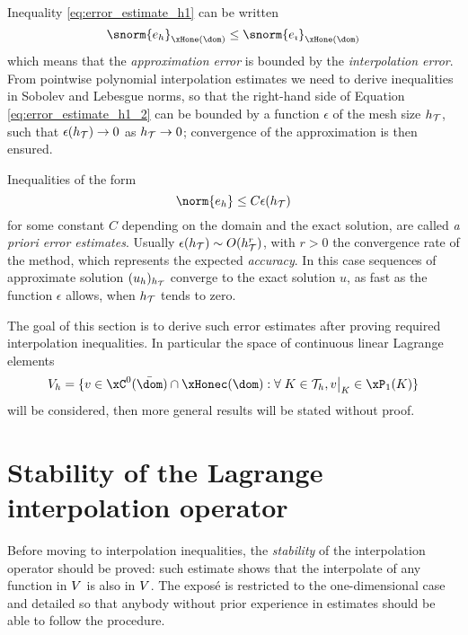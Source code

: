 \medskip
Inequality \eqref{eq:error_estimate_h1} can be written
\begin{equation}\label{eq:error_estimate_h1_2}
\snorm{e_h}_{\xHone(\dom)} \leq \snorm{e_\imath}_{\xHone(\dom)}
\end{equation}
which means that the \textit{approximation error} is bounded by the \textit{interpolation error}.
From pointwise polynomial interpolation estimates we need to derive inequalities in Sobolev and Lebesgue norms, so that the right-hand side of Equation \eqref{eq:error_estimate_h1_2} can be bounded by a function $\epsilon$ of the mesh size $h_{\mathcal T}$, such that $\epsilon(h_{\mathcal T}) \rightarrow 0$ as $h_{\mathcal T} \rightarrow 0$; convergence of the approximation is then ensured.

\medskip
Inequalities of the form
\begin{equation*}
\norm{e_h} \leq C \epsilon(\sizeT)
\end{equation*}
for some constant $C$ depending on the domain and the exact solution, are called \textit{a priori error estimates}.
Usually $\epsilon(h_{\mathcal T}) \sim O(h_{\mathcal T}^r)$, with $r > 0$ the convergence rate of the method, which represents the expected \textit{accuracy}.
In this case sequences of approximate solution $(u_h)_{h_{\mathcal T}}$ converge to the exact solution $u$, as fast as the function $\epsilon$ allows, when $h_{\mathcal T}$ tends to zero.

\medskip
The goal of this section is to derive such error estimates after proving required interpolation inequalities.
In particular the space of continuous linear Lagrange elements
\begin{equation}\label{sp:lagrangeP1}
\xVh = \lbrace v \in \xC^0(\bar\dom)\cap\xHonec(\dom) : \forany K \in \meshT, \Restrict{v}{K} \in \xPone(K) \rbrace
\end{equation}
will be considered, then more general results will be stated without proof.

\section{Stability of the Lagrange interpolation operator}

Before moving to interpolation inequalities, the \textit{stability} of the interpolation operator should be proved: such estimate shows that the interpolate of any function in ${V}$ is also in ${V}$.
The exposé is restricted to the one-dimensional case and detailed so that anybody without prior experience in estimates should be able to follow the procedure.

